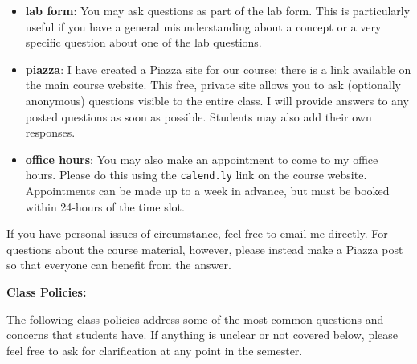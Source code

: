 \documentclass[12pt]{article}
\begin{document}
\begin{itemize}
\item \textbf{lab form}: You may ask questions as part of the lab form. This
is particularly useful if you have a general misunderstanding about a concept
or a very specific question about one of the lab questions.
\item \textbf{piazza}: I have created a Piazza site for our course; there is
a link available on the main course website. This free, private site allows
you to ask (optionally anonymous) questions visible to the entire class. I
will provide answers to any posted questions as soon as possible. Students may
also add their own responses.
\item \textbf{office hours}: You may also make an appointment to come to my
office hours. Please do this using the \texttt{calend.ly} link on the course
website. Appointments can be made up to a week in advance, but must be booked
within 24-hours of the time slot.
\end{itemize}

If you have personal issues of circumstance, feel free to email me directly.
For questions about the course material, however, please instead make a Piazza
post so that everyone can benefit from the answer.

\vspace{0.5cm}

\textbf{Class Policies:} \vspace{6pt}

The following class policies address some of the most common questions and
concerns that students have. If anything is unclear or not covered below,
please feel free to ask for clarification at any point in the semester.
\end{document}
